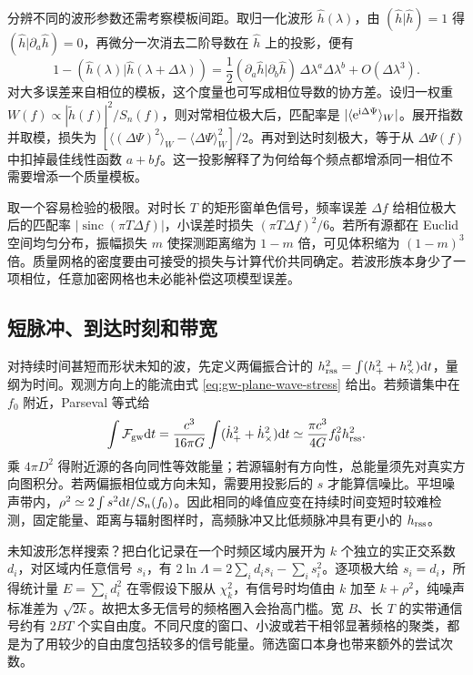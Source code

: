 分辨不同的波形参数还需考察模板间距。取归一化波形 $\hat h(\lambda)$，由 $(\hat h|\hat h)=1$ 得 $(\hat h|\partial_a\hat h)=0$，再微分一次消去二阶导数在 $\hat h$ 上的投影，便有
\[
 1-(\hat h(\lambda)|\hat h(\lambda+\Delta\lambda))
 =\frac{1}{2}(\partial_a\hat h|\partial_b\hat h)\,
              \Delta\lambda^a\Delta\lambda^b+O(\Delta\lambda^3).
\]
对大多误差来自相位的模板，这个度量也可写成相位导数的协方差。设归一权重 $W(f)\propto|\tilde h(f)|^2/S_n(f)$，则对常相位极大后，匹配率是 $|\langle\mathrm{e}^{\mathrm{i}\Delta\Psi}\rangle_W|$。展开指数并取模，损失为 $[\langle(\Delta\Psi)^2\rangle_W-\langle\Delta\Psi\rangle_W^2]/2$。再对到达时刻极大，等于从 $\Delta\Psi(f)$ 中扣掉最佳线性函数 $a+bf$。这一投影解释了为何给每个频点都增添同一相位不需要增添一个质量模板。

取一个容易检验的极限。对时长 $T$ 的矩形窗单色信号，频率误差 $\Delta f$ 给相位极大后的匹配率 $|\operatorname{sinc}(\pi T\Delta f)|$，小误差时损失 $(\pi T\Delta f)^2/6$。若所有源都在 Euclid 空间均匀分布，振幅损失 $m$ 使探测距离缩为 $1-m$ 倍，可见体积缩为 $(1-m)^3$ 倍。质量网格的密度要由可接受的损失与计算代价共同确定。若波形族本身少了一项相位，任意加密网格也未必能补偿这项模型误差。

\subsection{短脉冲、到达时刻和带宽}\label{sec:gw-b-burst}
对持续时间甚短而形状未知的波，先定义两偏振合计的 $h_{\rm rss}^2=\int(h_+^2+h_\times^2)\dd t$，量纲为时间。观测方向上的能流由式 \eqref{eq:gw-plane-wave-stress} 给出。若频谱集中在 $f_0$ 附近，Parseval 等式给
\[
 \int {\cal F}_{\rm gw}\dd t
 =\frac{c^3}{16\pi G}\int(\dot h_+^2+\dot h_\times^2)\dd t
 \simeq \frac{\pi c^3}{4G}f_0^2h_{\rm rss}^2 .
\]
乘 $4\pi D^2$ 得附近源的各向同性等效能量；若源辐射有方向性，总能量须先对真实方向图积分。若两偏振相位或方向未知，需要用投影后的 $s$ 才能算信噪比。平坦噪声带内，$\rho^2\simeq2\int s^2\dd t/S_n(f_0)$。因此相同的峰值应变在持续时间变短时较难检测，固定能量、距离与辐射图样时，高频脉冲又比低频脉冲具有更小的 $h_{\rm rss}$。

未知波形怎样搜索？把白化记录在一个时频区域内展开为 $k$ 个独立的实正交系数 $d_i$，对区域内任意信号 $s_i$，有 $2\ln\Lambda=2\sum_i d_i s_i-\sum_i s_i^2$。逐项极大给 $s_i=d_i$，所得统计量 $E=\sum_i d_i^2$ 在零假设下服从 $\chi_k^2$，有信号时均值由 $k$ 加至 $k+\rho^2$，纯噪声标准差为 $\sqrt{2k}$。故把太多无信号的频格圈入会抬高门槛。宽 $B$、长 $T$ 的实带通信号约有 $2BT$ 个实自由度。不同尺度的窗口、小波或若干相邻显著频格的聚类，都是为了用较少的自由度包括较多的信号能量。筛选窗口本身也带来额外的尝试次数。

